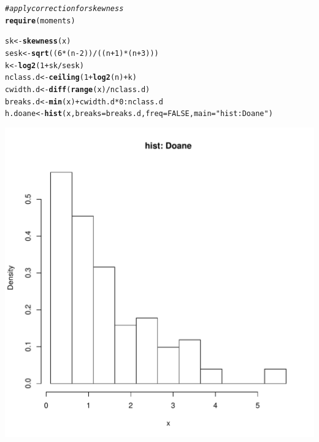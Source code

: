 \documentclass{article}\usepackage[]{graphicx}\usepackage[]{color}
\makeatletter
\def\maxwidth{ %
  \ifdim\Gin@nat@width>\linewidth
    \linewidth
  \else
    \Gin@nat@width
  \fi
}
\newcommand{\hlstr}[1]{\textcolor[rgb]{0.192,0.494,0.8}{#1}}%
\newcommand{\hlcom}[1]{\textcolor[rgb]{0.678,0.584,0.686}{\textit{#1}}}%
\newcommand{\hlkwd}[1]{\textcolor[rgb]{0.737,0.353,0.396}{\textbf{#1}}}%
\newenvironment{kframe}{%
 \def\at@end@of@kframe{}%
 \ifinner\ifhmode%
  \def\at@end@of@kframe{\end{minipage}}%
  \begin{minipage}{\columnwidth}%
 \fi\fi%
 \def\FrameCommand##1{\hskip\@totalleftmargin \hskip-\fboxsep
 \colorbox{shadecolor}{##1}\hskip-\fboxsep
     \hskip-\linewidth \hskip-\@totalleftmargin \hskip\columnwidth}%
 \MakeFramed {\advance\hsize-\width
   \@totalleftmargin\z@ \linewidth\hsize
   \@setminipage}}%
 {\par\unskip\endMakeFramed%
 \at@end@of@kframe}
\makeatother
\begin{document}
\begin{itemize}
\begin{kframe}
\begin{alltt}
\hlcom{# apply correction for skewness}
\hlkwd{require}(moments)
\end{alltt}


{\ttfamily\noindent\itshape\color{messagecolor}{\#\# Loading required package: moments}}\begin{alltt}
sk <- \hlkwd{skewness}(x)
sesk <- \hlkwd{sqrt}((6 * (n - 2))/((n + 1) * (n + 3)))
k <- \hlkwd{log2}(1 + sk/sesk)
nclass.d <- \hlkwd{ceiling}(1 + \hlkwd{log2}(n) + k)
cwidth.d <- \hlkwd{diff}(\hlkwd{range}(x)/nclass.d)
breaks.d <- \hlkwd{min}(x) + cwidth.d * 0:nclass.d
h.doane <- \hlkwd{hist}(x, breaks = breaks.d, freq = FALSE, main = \hlstr{"hist: Doane"})
\end{alltt}
\end{kframe}
\includegraphics[width=\maxwidth]{figure/ten12} 
\begin{kframe}\begin{alltt}


\end{alltt}
\end{kframe}
\end{itemize}
\end{document}
